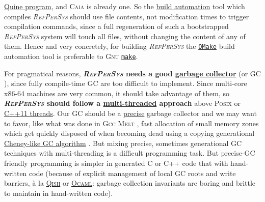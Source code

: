 \documentclass[11pt,a4paper,svgnames]{article}
\newcommand{\RefPerSys}{{\textit{\textsc{RefPerSys}}}}
\begin{document}
\href{https://en.wikipedia.org/wiki/Quine\_(computing)}{Quine
  program}, and \textsc{Caia} is already one. So the
\href{https://en.wikipedia.org/wiki/Build\_automation}{build
  automation} tool which compiles {\RefPerSys} should use file
contents, not modification times to trigger compilation commands,
since a full regeneration of such a bootstrapped {\RefPerSys} system
will touch all files, without changing the content of any of
them. Hence and very concretely, for building {\RefPerSys} the
\href{http://projects.camlcity.org/projects/omake.html}{\texttt{OMake}}
build automation tool is preferable to \textsc{Gnu}
\href{https://www.gnu.org/software/make/}{\texttt{make}}.

For pragmatical reasons, \textbf{{\RefPerSys} needs a good
  \href{https://en.wikipedia.org/wiki/Tracing\_garbage\_collection}{garbage
    collector}} (or GC \cite{appel:1991:garbage,
  wilson:1992:uniprocessorgc, baker:1995:cons,
  jones:2016:gchandbook}), since fully compile-time GC
\cite{mazur:2004:compile} are too difficult to implement. Since
multi-core x86-64 machines are very common, it should take advantage
of them, so \textbf{{\RefPerSys} should follow a
  \href{https://en.wikipedia.org/wiki/Thread_(computing)}{multi-threaded}
  approach} above \textsc{Posix} \cite{barney:2010:pthreads} or
\href{https://en.cppreference.com/w/cpp/thread}{C++11 threads}. Our GC
should be a
\href{https://en.wikipedia.org/wiki/Tracing_garbage_collection#Precise_vs._conservative_and_internal_pointers}{precise}
garbage collector \cite{Rafkind:2009:PreciseGC} and we may want to
favor, like what was done in \textsc{Gcc Melt}
\cite{Starynkevitch:2007:Multistage, Starynkevitch-DSL2011,
  Starynkevitch-GCCMELTweb}, fast allocation of small memory zones
which get quickly disposed of when becoming dead using a copying
generational
\href{https://en.wikipedia.org/wiki/Cheney's\_algorithm}{Cheney-like
  GC algorithm} \cite{wilson:1992:uniprocessorgc}.  But mixing
precise, sometimes generational GC techniques with multi-threading is
a difficult programming task. But precise-GC friendly programming is
simpler in generated C or C++ code that with hand-written code
(because of explicit management of local GC roots and write barriers,
à la
\href{http://starynkevitch.net/Basile/qishintro.html}{\textsc{Qish}}
or
\href{https://caml.inria.fr/pub/docs/manual-ocaml/intfc.html}{\textsc{Ocaml}}:
garbage collection invariants are boring and brittle to maintain in
hand-written code).
\end{document}
